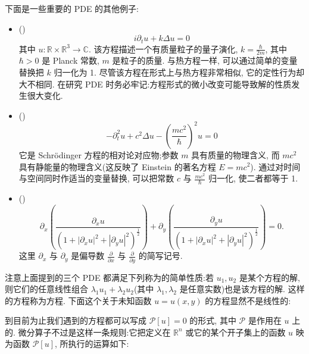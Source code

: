 下面是一些重要的 PDE 的其他例子:

\begin{itemize}
\item ()
\begin{equation}\label{eq:c0-4}
i \partial_{t} u + k \Delta u = 0
\end{equation}
其中 $u : \mathbb{R} \times \mathbb{R}^{3} \to \mathbb{C}$.
该方程描述一个有质量粒子的量子演化, $k = \frac{\hbar}{2 m}$, 其中 $\hbar > 0$ 是 Planck 常数, $m$ 是粒子的质量.
与热方程一样, 可以通过简单的变量替换把 $k$ 归一化为 1.
尽管该方程在形式上与热方程非常相似, 它的定性行为却大不相同.
在研究 PDE 时务必牢记:方程形式的微小改变可能导致解的性质发生很大变化.
\item ()
\begin{equation}\label{eq:c0-5}
-\partial_{t}^{2} u + c^{2} \Delta u - \left(\frac{m c^{2}}{\hbar}\right)^{2} u = 0
\end{equation}
它是 Schrödinger 方程的相对论对应物;参数 $m$ 具有质量的物理含义, 而 $m c^{2}$ 具有静能量的物理含义(这反映了 Einstein 的著名方程 $E = m c^{2}$).
通过对时间与空间同时作适当的变量替换, 可以把常数 $c$ 与 $\frac{m c^{2}}{\hbar}$ 归一化, 使二者都等于 1.
\item ()
\begin{equation}\label{eq:c0-6}
\partial_{x}\left(\frac{\partial_{x} u}{(1 + |\partial_{x} u|^{2} + |\partial_{y} u|^{2})^{\frac{1}{2}}}\right) + \partial_{y}\left(\frac{\partial_{y} u}{(1 + |\partial_{x} u|^{2} + |\partial_{y} u|^{2})^{\frac{1}{2}}}\right) = 0.
\end{equation}
这里 $\partial_{x}$ 与 $\partial_{y}$ 是偏导数 $\frac{\partial}{\partial x}$ 与 $\frac{\partial}{\partial y}$ 的简写记号.
\end{itemize}

注意上面提到的三个 PDE 都满足下列称为的简单性质:若 $u_{1}, u_{2}$ 是某个方程的解, 则它们的任意线性组合 $\lambda_{1} u_{1} + \lambda_{2} u_{2}$(其中 $\lambda_{1}, \lambda_{2}$ 是任意实数)也是该方程的解.
这样的方程称为方程.
下面这个关于未知函数 $u = u(x, y)$ 的方程显然不是线性的:

到目前为止我们遇到的方程都可以写成 $\mathcal{P}[u] = 0$ 的形式, 其中 $\mathcal{P}$ 是作用在 $u$ 上的.
微分算子不过是这样一条规则:它把定义在 $\mathbb{R}^{n}$ 或它的某个开子集上的函数 $u$ 映为函数 $\mathcal{P}[u]$, 所执行的运算如下:

